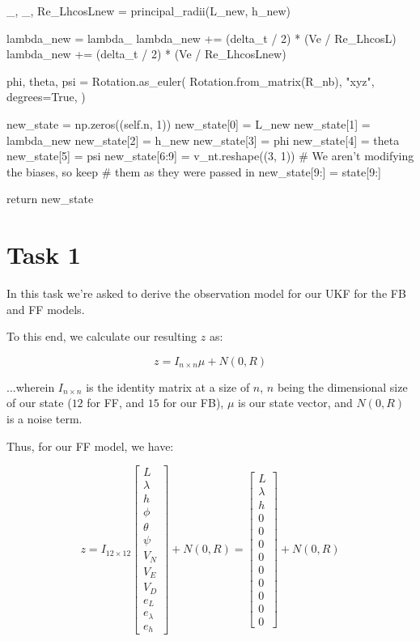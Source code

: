 \documentclass{article}
\begin{document}
\begin{python}
    _, _, Re_LhcosLnew = principal_radii(L_new, h_new)

    lambda_new = lambda_
    lambda_new += (delta_t / 2) * (Ve / Re_LhcosL)
    lambda_new += (delta_t / 2) * (Ve / Re_LhcosLnew)

    phi, theta, psi = Rotation.as_euler(
    Rotation.from_matrix(R_nb),
    "xyz",
    degrees=True,
    )

    new_state = np.zeros((self.n, 1))
    new_state[0] = L_new
    new_state[1] = lambda_new
    new_state[2] = h_new
    new_state[3] = phi
    new_state[4] = theta
    new_state[5] = psi
    new_state[6:9] = v_nt.reshape((3, 1))
    # We aren't modifying the biases, so keep
    # them as they were passed in
    new_state[9:] = state[9:]

    return new_state
\end{python}

\section*{Task 1}

In this task we're asked to derive the observation model for our UKF for the FB and FF models.

To this end, we calculate our resulting $z$ as:

\begin{equation}
    z = I_{n\times n} \mu + N(0, R)
\end{equation}

...wherein $I_{n\times n}$ is the identity matrix at a size of $n$, $n$ being the dimensional size of our state ($12$ for FF, and $15$ for our FB), $\mu$ is our state vector, and $N(0, R)$ is a noise term.

Thus, for our FF model, we have:

\begin{equation}
    z = I_{12\times 12} \begin{bmatrix}
        L \\ \lambda \\ h \\ \phi \\ \theta \\ \psi \\ V_N \\ V_E \\ V_D \\ e_L \\ e_\lambda \\ e_h
    \end{bmatrix} + N(0, R) = \begin{bmatrix}
        L \\ \lambda \\ h \\ 0 \\ 0 \\ 0 \\ 0 \\ 0 \\ 0 \\ 0 \\ 0 \\ 0
    \end{bmatrix} + N(0, R)
\end{equation}
\end{document}

